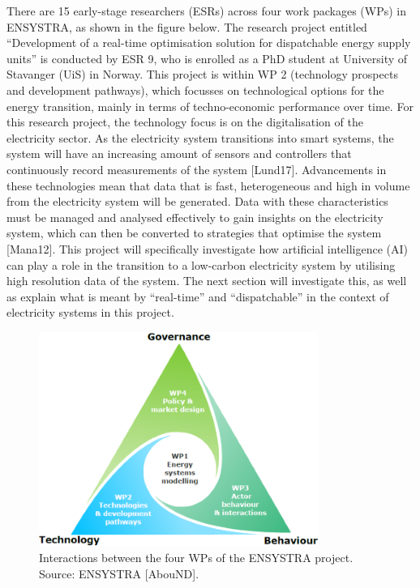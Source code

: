 There are 15 early-stage researchers (ESRs) across four work packages
(WPs) in ENSYSTRA, as shown in the figure below. The research project
entitled ``Development of a real-time optimisation solution for
dispatchable energy supply units'' is conducted by ESR 9, who is
enrolled as a PhD student at University of Stavanger (UiS) in Norway.
This project is within WP 2 (technology prospects and development
pathways), which focusses on technological options for the energy
transition, mainly in terms of techno-economic performance over time.
For this research project, the technology focus is on the digitalisation
of the electricity sector. As the electricity system transitions into
smart systems, the system will have an increasing amount of sensors and
controllers that continuously record measurements of the system
{[}Lund17{]}. Advancements in these technologies mean that data that is
fast, heterogeneous and high in volume from the electricity system will
be generated. Data with these characteristics must be managed and
analysed effectively to gain insights on the electricity system, which
can then be converted to strategies that optimise the system
{[}Mana12{]}. This project will specifically investigate how artificial
intelligence (AI) can play a role in the transition to a low-carbon
electricity system by utilising high resolution data of the system. The
next section will investigate this, as well as explain what is meant by
``real-time'' and ``dispatchable'' in the context of electricity systems
in this project.

\begin{figure}
\centering
\includegraphics{images/wp.png}
\caption{Interactions between the four WPs of the ENSYSTRA project.
Source: ENSYSTRA {[}AbouND{]}.}
\end{figure}
